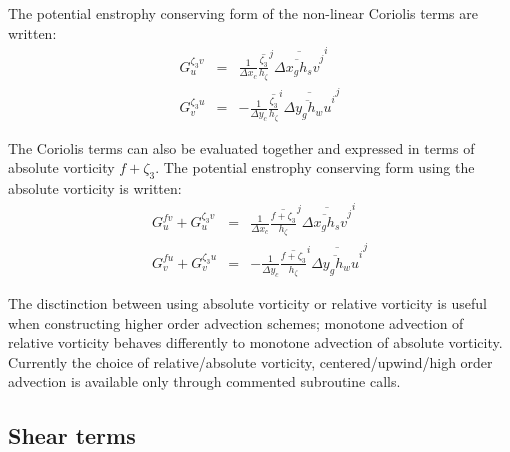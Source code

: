 The potential enstrophy conserving form of the non-linear Coriolis
terms are written:
\begin{eqnarray}
G_u^{\zeta_3 v} & = &
\frac{1}{\Delta x_c}
\overline{ \frac{\zeta_3}{h_\zeta} }^j \overline{ \overline{ \Delta x_g h_s v }^j }^i \\
G_v^{\zeta_3 u} & = & -
\frac{1}{\Delta y_c}
\overline{ \frac{\zeta_3}{h_\zeta} }^i \overline{ \overline{ \Delta y_g h_w u }^i }^j
\end{eqnarray}

The Coriolis terms can also be evaluated together and expressed in
terms of absolute vorticity $f+\zeta_3$. The potential enstrophy
conserving form using the absolute vorticity is written:
\begin{eqnarray}
G_u^{fv} + G_u^{\zeta_3 v} & = &
\frac{1}{\Delta x_c}
\overline{ \frac{f + \zeta_3}{h_\zeta} }^j \overline{ \overline{ \Delta x_g h_s v }^j }^i \\
G_v^{fu} + G_v^{\zeta_3 u} & = & -
\frac{1}{\Delta y_c}
\overline{ \frac{f + \zeta_3}{h_\zeta} }^i \overline{ \overline{ \Delta y_g h_w u }^i }^j
\end{eqnarray}

 The
disctinction between using absolute vorticity or relative vorticity is
useful when constructing higher order advection schemes; monotone
advection of relative vorticity behaves differently to monotone
advection of absolute vorticity. Currently the choice of
relative/absolute vorticity, centered/upwind/high order advection is
available only through commented subroutine calls.



\subsection{Shear terms}

